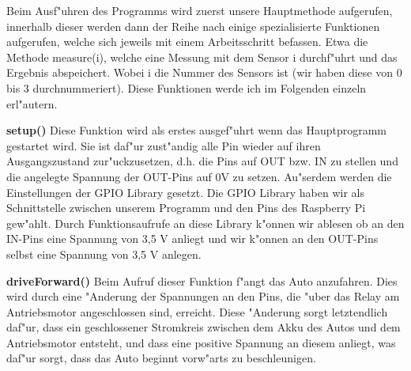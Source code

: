 \documentclass[a4paper,12pt]{article}
\begin{document}
\medskip

Beim Ausf"uhren des Programms wird zuerst unsere Hauptmethode aufgerufen, innerhalb dieser werden dann der Reihe nach einige spezialisierte Funktionen aufgerufen, welche sich jeweils mit einem Arbeitsschritt befassen.
Etwa die Methode measure(i), welche eine Messung mit dem Sensor i durchf"uhrt und das Ergebnis abspeichert.
Wobei i die Nummer des Sensors ist (wir haben diese von 0 bis 3 durchnummeriert).
Diese Funktionen werde ich im Folgenden einzeln erl"autern.

\medskip

\textbf{setup()}
\newline
Diese Funktion wird als erstes ausgef"uhrt wenn das Hauptprogramm gestartet wird.
Sie ist daf"ur zust"andig alle Pin wieder auf ihren Ausgangszustand zur"uckzusetzen, d.h. die Pins auf OUT bzw. IN zu stellen und die angelegte Spannung der OUT-Pins auf 0V zu setzen.
Au"serdem werden die Einstellungen der GPIO Library gesetzt.
Die GPIO Library haben wir als Schnittstelle zwischen unserem Programm und den Pins des Raspberry Pi gew"ahlt.
Durch Funktionsaufrufe an diese Library k"onnen wir ablesen ob an den IN-Pins eine Spannung von 3,5 V anliegt und wir k"onnen an den OUT-Pins selbst eine Spannung von 3,5 V anlegen.

\medskip

\textbf{driveForward()}
\newline
Beim Aufruf dieser Funktion f"angt das Auto anzufahren.
Dies wird durch eine "Anderung der Spannungen an den Pins, die "uber das Relay am Antriebsmotor angeschlossen sind, erreicht.
Diese "Anderung sorgt letztendlich daf"ur, dass ein geschlossener Stromkreis zwischen dem Akku des Autos und dem Antriebsmotor entsteht, und dass eine positive Spannung an
diesem anliegt, was daf"ur sorgt, dass das Auto beginnt vorw"arts zu beschleunigen.

\medskip
\end{document}
